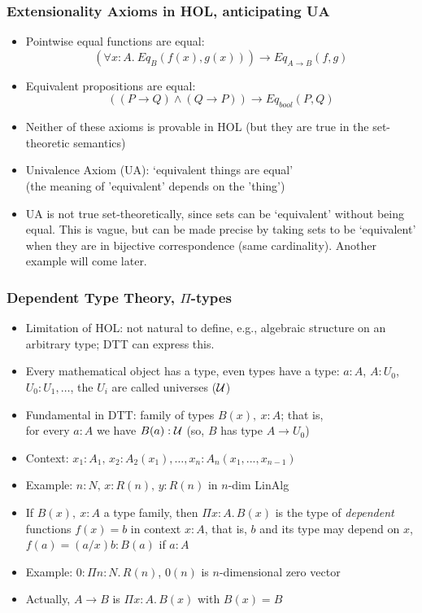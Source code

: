 \documentclass[handout]{beamer}
\newcommand{\depi}[3]{\Pi{#1{:}#2.\,#3}}
\newcommand{\UU}{{\cal U}}
\begin{document}
\frame
  {
  
    \frametitle{Extensionality Axioms in HOL, anticipating UA}

    \begin{itemize}[<+->]
    \item Pointwise equal functions are equal:
    \[(\forall x:A.~Eq_B(f(x),g(x))) \to Eq_{A\to B}(f,g)\]
    \item Equivalent propositions are equal:
    \[((P\to Q)\land(Q\to P)) \to Eq_{bool}(P,Q)\]
    \item Neither of these axioms is provable in HOL (but they are true in the set-theoretic semantics)
    \item Univalence Axiom (UA): `equivalent things are equal'\\
    (the meaning of 'equivalent' depends on the 'thing')
    \item UA is not true set-theoretically, since sets can be `equivalent'
    without being equal. This is vague, but can be made precise by
    taking sets to be `equivalent' when they are in bijective correspondence (same cardinality).
    Another example will come later.
    \end{itemize}
  }




\frame
  {
  
    \frametitle{Dependent Type Theory, $\Pi$-types}

    \begin{itemize}[<+->]
    \item Limitation of HOL: not natural to define, e.g., 
               algebraic structure on an arbitrary type; DTT can express this.
    \item Every mathematical object has a type, even types have a type:
    $a:A$, $A:U_0$, $U_0:U_1,\ldots$, the $U_i$ are called universes ($\UU$)
    \item Fundamental in DTT: family of types $B(x),~x:A$; that is,\\
    for every $a:A$ we have $B(a):\UU$  (so, $B$ has type $A\to U_0$)
    \item Context: $x_1:A_1,\,x_2:A_2(x_1), \ldots , x_n : A_n(x_1,...,x_{n-1})$
    \item Example: $n:N,\,x: R(n), \,y: R(n)$ in $n$-dim LinAlg
    \item If $B(x),~x:A$ a type family, then $\depi{x}{A}{B(x)}$ 
    is the type of \emph{dependent} functions %
    $f(x)=b$ in context $x:A$, that is, 
    $b$ {\color{red} and its type} may depend on $x$, $f(a)=(a/x)b : B(a)$ if $a:A$
   \item Example: $0:\depi{n}{N}{R(n)}$, $0(n)$ is $n$-dimensional zero vector
    \item Actually, $A\to B$ is $\depi{x}{A}{B(x)}$ with $B(x)=B$
    \end{itemize}
  }
\end{document}
